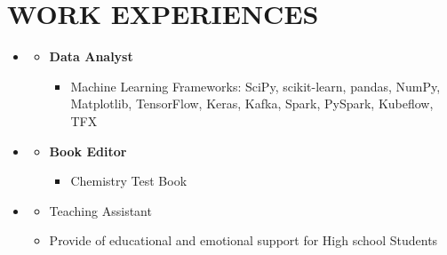 \documentclass[10pt,a4paper,sans]{moderncv} %
\begin{document}
	\vspace{ 1.3 em}
	
	\vspace{-2.3em}
	\section{WORK EXPERIENCES}
	
	
	\begin{itemize}
		\item \href{https://www.foumanchimie.com/}{}
		
		\begin{itemize}
			\item \textbf{Data Analyst} 
			    \begin{itemize}
			        \item Machine Learning Frameworks: \newline
			        SciPy, scikit-learn, pandas, NumPy, Matplotlib, TensorFlow, Keras, Kafka, Spark, PySpark, Kubeflow, TFX
			        
				\end{itemize}
		\end{itemize}
	\end{itemize}
	

	\begin{itemize}
		\item \href{https://kheilisabz.com/}{}
		
		\begin{itemize}
			\item \textbf{Book Editor} 
			    \begin{itemize}
			        \item Chemistry Test Book 
			        
				\end{itemize}
		\end{itemize}
	\end{itemize}
	
	
	\vspace{0.71 em}
	
		\begin{itemize}
		
		\item \href{https://www.kanoon.ir/}{}
		
		
		\begin{itemize}
			
			\item Teaching Assistant
				\item Provide of educational and emotional support for High school Students

		\end{itemize}
	\end{itemize}
	
\end{document}
